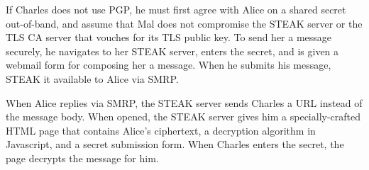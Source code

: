 If Charles does not use PGP, he must first agree with Alice on a shared secret out-of-band, and assume that Mal does not compromise the STEAK server or the TLS CA server that vouches for its TLS public key.  To send her a message securely, he navigates to her STEAK server, enters the secret, and is given a webmail form for composing her a message.  When he submits his message, STEAK it available to Alice via SMRP.

When Alice replies via SMRP, the STEAK server sends Charles a URL instead of the message body.  When opened, the STEAK server gives him a specially-crafted HTML page that contains Alice’s ciphertext, a decryption algorithm in Javascript, and a secret submission form.  When Charles enters the secret, the page decrypts the message for him.
